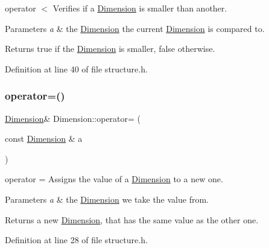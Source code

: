 operator $<$ Verifies if a \hyperlink{struct_dimension}{Dimension} is smaller than another. 


\begin{DoxyParams}{Parameters}
{\em a} & the \hyperlink{struct_dimension}{Dimension} the current \hyperlink{struct_dimension}{Dimension} is compared to. \\
\hline
\end{DoxyParams}
\begin{DoxyReturn}{Returns}
true if the \hyperlink{struct_dimension}{Dimension} is smaller, false otherwise. 
\end{DoxyReturn}


Definition at line 40 of file structure.\+h.

\mbox{\label{struct_dimension_acbce569721e053b72d6ed134ed649fe4}} 
\subsubsection{\texorpdfstring{operator=()}{operator=()}}
{\footnotesize\ttfamily \hyperlink{struct_dimension}{Dimension}\& Dimension\+::operator= (\begin{DoxyParamCaption}\item[{const \hyperlink{struct_dimension}{Dimension} \&}]{a }\end{DoxyParamCaption})\hspace{0.3cm}{\ttfamily [inline]}}



operator = Assigns the value of a \hyperlink{struct_dimension}{Dimension} to a new one. 


\begin{DoxyParams}{Parameters}
{\em a} & the \hyperlink{struct_dimension}{Dimension} we take the value from. \\
\hline
\end{DoxyParams}
\begin{DoxyReturn}{Returns}
a new \hyperlink{struct_dimension}{Dimension}, that has the same value as the other one. 
\end{DoxyReturn}


Definition at line 28 of file structure.\+h.

\mbox{\label{struct_dimension_aa50ef143b3130d4810950788a580b342}} 
